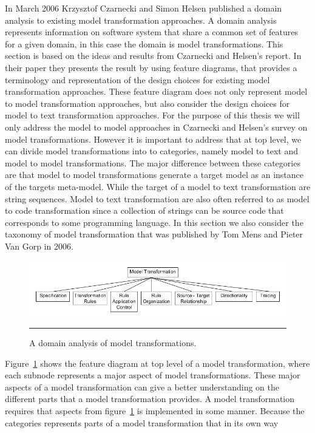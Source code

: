 In March 2006 Krzysztof Czarnecki and Simon Helsen published a domain analysis
to existing model transformation approaches\cite{Czarnecki2006}. A domain
analysis represents information on software system that share a common set of
features for a given domain\cite{FODA,Prieto-Diaz1990}, in this case the domain
is model transformations. This section is based on the ideas and results from
Czarnecki and Helsen's report. In their paper they presents the result by using
feature diagrams, that provides a terminology and representation of the design
choices for existing model transformation approaches. These feature diagram does
not only represent model to model transformation approaches, but also consider
the design choices for model to text transformation approaches. For the purpose
of this thesis we will only address the model to model approaches in Czarnecki
and Helsen's survey on model transformations. However it is important to
address that at top level, we can divide model transformations into to
categories, namely model to text and model to model transformations. The major
difference between these categories are that model to model transformations
generate a target model as an instance of the targets meta-model. While the
target of a model to text transformation are string sequences. Model to text
transformation are also often referred to as model to code transformation since
a collection of strings can be source code that corresponds to some programming
language. In this section we also consider the taxonomy of model
transformation\cite{Mens2006} that was published by Tom Mens and Pieter Van Gorp
in 2006. 

\begin{figure}[H]
  \centering
    \includegraphics[scale=0.7]{./Figures/Model_Transformation_Survey.png}
    \rule{35em}{0.5pt}
  \caption[Domain Analysis of Model Transformations]
  				{A domain analysis of model transformations\cite{Czarnecki2006}.}
  \label{fig:Model_Transformation_Survey}
\end{figure}

Figure~\ref{fig:Model_Transformation_Survey} shows the feature diagram at top
level of a model transformation, where each subnode represents a major aspect
of model transformations. These major aspects of a model transformation can
give a better understanding on the different parts that a model transformation
provides. A model transformation requires that aspects from
figure~\ref{fig:Model_Transformation_Survey} is implemented in some manner.
Because the categories represents parts of a model transformation that in its
own way

